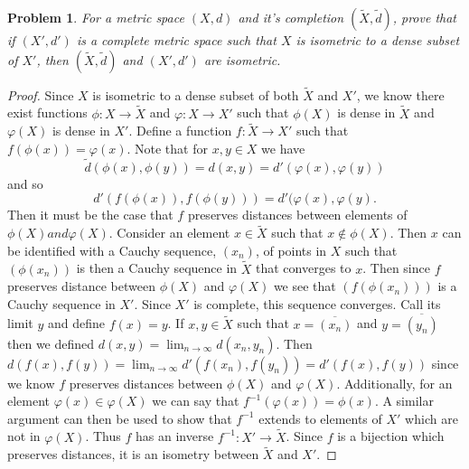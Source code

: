 \documentclass{article}
\newtheorem{problem}{Problem}
\begin{document}
\begin{flushleft}
\begin{problem}
For a metric space $(X, d)$ and it's completion $(\widetilde{X}, \widetilde{d})$, prove that if $(X', d')$ is a complete metric space such that $X$ is isometric to a dense subset of $X'$, then $(\widetilde{X}, \widetilde{d})$ and $(X', d')$ are isometric.
\end{problem}
\begin{proof}
Since $X$ is isometric to a dense subset of both $\widetilde{X}$ and $X'$, we know there exist functions $\phi : X \rightarrow \widetilde{X}$ and $\varphi : X \rightarrow X'$ such that $\phi(X)$ is dense in $\widetilde{X}$ and $\varphi(X)$ is dense in $X'$. Define a function $f : \widetilde{X} \rightarrow X'$ such that $f(\phi(x)) = \varphi(x)$. Note that for $x, y \in X$ we have
\[
\widetilde{d}(\phi(x), \phi(y)) = d(x,y) = d'(\varphi(x), \varphi(y))
\]
and so
\[
d'(f(\phi(x)), f(\phi(y))) = d'(\varphi(x), \varphi(y).
\]
Then it must be the case that $f$ preserves distances between elements of $\phi(X) and \varphi(X)$. Consider an element $x \in \widetilde{X}$ such that $x \notin \phi(X)$. Then $x$ can be identified with a Cauchy sequence, $(x_n)$, of points in $X$ such that $(\phi(x_n))$ is then a Cauchy sequence in $\widetilde{X}$ that converges to $x$. Then since $f$ preserves distance between $\phi(X)$ and $\varphi(X)$ we see that $(f(\phi(x_n)))$ is a Cauchy sequence in $X'$. Since $X'$ is complete, this sequence converges. Call its limit $y$ and define $f(x) = y$. If $x, y \in \widetilde{X}$ such that $x = \overline{(x_n)}$ and $y = \overline{(y_n)}$ then we defined $d(x,y) = \lim_{n \rightarrow \infty} d(x_n, y_n)$. Then $d(f(x), f(y)) = \lim_{n \rightarrow \infty} d'(f(x_n), f(y_n)) = d'(f(x), f(y))$ since we know $f$ preserves distances between $\phi(X)$ and $\varphi(X)$. Additionally, for an element $\varphi(x) \in \varphi(X)$ we can say that $f^{-1}(\varphi(x)) = \phi(x)$. A similar argument can then be used to show that $f^{-1}$ extends to elements of $X'$ which are not in $\varphi(X)$. Thus $f$ has an inverse $f^{-1} : X' \rightarrow \widetilde{X}$. Since $f$ is a bijection which preserves distances, it is an isometry between $\widetilde{X}$ and $X'$.
\end{proof}


\end{flushleft}
\end{document}
